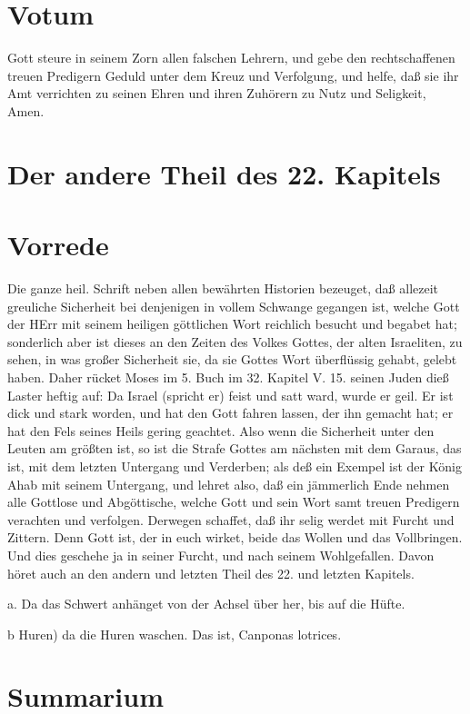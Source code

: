 \section{Votum}

Gott steure in seinem Zorn allen falschen Lehrern, und gebe den rechtschaffenen treuen Predigern Geduld unter dem Kreuz und Verfolgung, und helfe, daß sie ihr Amt verrichten zu seinen Ehren und ihren Zuhörern zu Nutz und Seligkeit, Amen.

\section{Der andere Theil des 22. Kapitels}

\section{Vorrede}

Die ganze heil. Schrift neben allen bewährten Historien bezeuget, daß allezeit greuliche Sicherheit bei denjenigen in vollem Schwange gegangen ist, welche Gott der HErr mit seinem heiligen göttlichen Wort reichlich besucht und begabet hat; sonderlich aber ist dieses an den Zeiten des Volkes Gottes, der alten Israeliten, zu sehen, in was großer Sicherheit sie, da sie
Gottes Wort überflüssig gehabt, gelebt haben. Daher rücket Moses im 5. Buch im 32. Kapitel V. 15. seinen Juden dieß Laster heftig auf: Da Israel (spricht er) feist und satt ward, wurde er geil. Er ist dick und stark worden, und hat den Gott fahren lassen, der ihn gemacht hat; er hat den Fels seines Heils gering geachtet. Also wenn die Sicherheit unter den Leuten am größten ist, so ist die Strafe Gottes am nächsten mit dem Garaus, das ist, mit dem letzten Untergang und Verderben; als deß ein Exempel ist der König Ahab mit seinem Untergang, und lehret also, daß ein jämmerlich Ende nehmen alle Gottlose und Abgöttische, welche Gott und sein Wort samt treuen Predigern verachten und verfolgen. Derwegen schaffet, daß ihr selig werdet mit Furcht und Zittern. Denn Gott ist, der in euch wirket, beide das Wollen und das Vollbringen. Und dies geschehe ja in seiner Furcht, und nach seinem Wohlgefallen. Davon höret auch an den andern und letzten Theil des 22. und letzten Kapitels.

a. Da das Schwert anhänget von der Achsel über her, bis auf die Hüfte.

b Huren) da die Huren waschen. Das ist, Canponas lotrices.

\section{Summarium}

